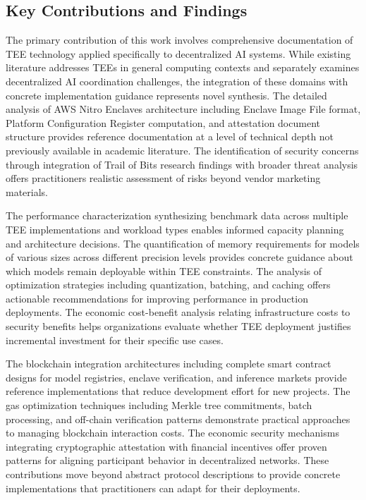 \subsection{Key Contributions and Findings}

The primary contribution of this work involves comprehensive documentation of TEE technology applied specifically to decentralized AI systems. While existing literature addresses TEEs in general computing contexts and separately examines decentralized AI coordination challenges, the integration of these domains with concrete implementation guidance represents novel synthesis. The detailed analysis of AWS Nitro Enclaves architecture including Enclave Image File format, Platform Configuration Register computation, and attestation document structure provides reference documentation at a level of technical depth not previously available in academic literature. The identification of security concerns through integration of Trail of Bits research findings with broader threat analysis offers practitioners realistic assessment of risks beyond vendor marketing materials.

The performance characterization synthesizing benchmark data across multiple TEE implementations and workload types enables informed capacity planning and architecture decisions. The quantification of memory requirements for models of various sizes across different precision levels provides concrete guidance about which models remain deployable within TEE constraints. The analysis of optimization strategies including quantization, batching, and caching offers actionable recommendations for improving performance in production deployments. The economic cost-benefit analysis relating infrastructure costs to security benefits helps organizations evaluate whether TEE deployment justifies incremental investment for their specific use cases.

The blockchain integration architectures including complete smart contract designs for model registries, enclave verification, and inference markets provide reference implementations that reduce development effort for new projects. The gas optimization techniques including Merkle tree commitments, batch processing, and off-chain verification patterns demonstrate practical approaches to managing blockchain interaction costs. The economic security mechanisms integrating cryptographic attestation with financial incentives offer proven patterns for aligning participant behavior in decentralized networks. These contributions move beyond abstract protocol descriptions to provide concrete implementations that practitioners can adapt for their deployments.

